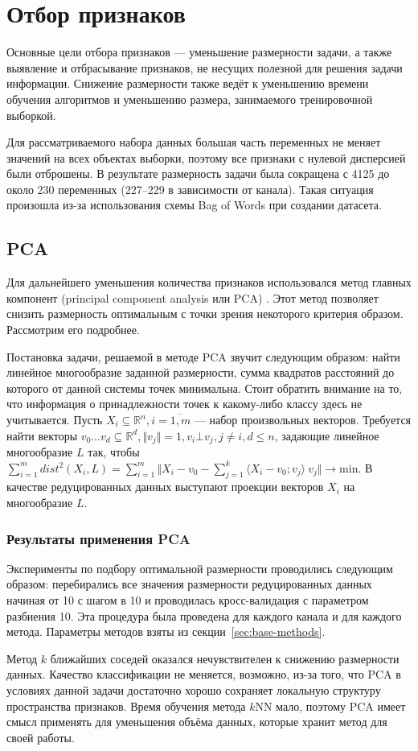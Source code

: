 \section{Отбор признаков}
Основные цели отбора признаков --- уменьшение размерности задачи, а также выявление и отбрасывание признаков, не несущих полезной для решения задачи информации. Снижение размерности также ведёт к уменьшению времени обучения алгоритмов и уменьшению размера, занимаемого тренировочной выборкой.
 \par
Для рассматриваемого набора данных большая часть переменных не меняет значений на всех объектах выборки, поэтому все признаки с нулевой дисперсией были отброшены. В результате размерность задачи была сокращена с 4125 до около 230 переменных (227--229 в зависимости от канала). Такая ситуация произошла из-за использования схемы Bag of Words при создании датасета.
\subsection{PCA}
Для дальнейшего уменьшения количества признаков использовался метод главных компонент (principal component analysis или PCA) \cite{pearson}. Этот метод позволяет снизить размерность оптимальным с точки зрения некоторого критерия образом. Рассмотрим его подробнее.
 \par
 Постановка задачи, решаемой в методе PCA звучит следующим образом: найти линейное многообразие заданной  размерности, сумма квадратов расстояний до которого от данной системы точек минимальна. Стоит обратить внимание на то, что информация о принадлежности точек к какому-либо классу здесь не учитывается. Пусть \( X_i \subseteq \mathbb{R}^n, i=\overline{1,m} \) --- набор произвольных векторов. Требуется найти векторы \(v_0\ldots v_d\subseteq \mathbb{R}^d, \Vert v_j \Vert = 1, v_i \bot v_j, j \neq  i, d \leq n\), задающие линейное многообразие \(L\) так, чтобы \( \sum_{i=1}^{m} dist^2(X_i, L) = \sum_{i=1}^{m}\Vert X_i - v_0 - \sum_{j=1}^k\langle X_i - v_0; v_j\rangle\ v_j \Vert\rightarrow \mathrm{min}\). В качестве редуцированных данных выступают проекции векторов \( X_i\) на многообразие \(L\). 
  
 \subsubsection*{Результаты применения PCA}
 Эксперименты по подбору оптимальной размерности проводились следующим образом: перебирались все значения 
 размерности редуцированных данных начиная от 10 с шагом в 10 и проводилась кросс-валидация с параметром разбиения 10. Эта процедура была проведена для каждого канала и для каждого метода. Параметры методов 
 взяты из секции~\ref{sec:base-methods}.
\par
Метод \(k\) ближайших соседей оказался нечувствителен к снижению размерности данных. Качество классификации не меняется, возможно, из-за того, что PCA в условиях данной задачи достаточно хорошо сохраняет локальную структуру пространства признаков. Время обучения метода \(k\)NN мало, поэтому PCA
имеет смысл применять для уменьшения объёма данных, которые хранит метод для своей работы.

